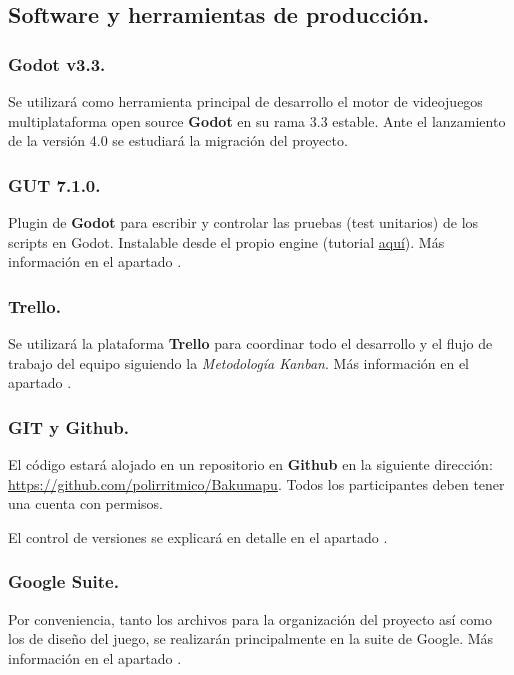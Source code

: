 \subsection{Software y herramientas de producción.}\label{intro:software-y-herramientas}

\subsubsection{Godot v3.3.}
Se utilizará como herramienta principal de desarrollo el motor de videojuegos multiplataforma open source \textbf{Godot} en su rama 3.3 estable. Ante el lanzamiento de la versión 4.0 se estudiará la migración del proyecto.

\subsubsection*{\small GUT 7.1.0.}
Plugin de \textbf{Godot} para escribir y controlar las pruebas (test unitarios) de los scripts en Godot. Instalable desde el propio engine (tutorial \href{https://www.youtube.com/watch?v=5DrhMiuLRl0}{aquí}). Más información en el apartado .

\subsubsection{Trello.}
Se utilizará la plataforma \textbf{Trello} para coordinar todo el desarrollo y el flujo de trabajo del equipo siguiendo la \emph{Metodología Kanban}. Más información en el apartado .

\subsubsection{GIT y Github.}
El código estará alojado en un repositorio  en \textbf{Github} en la siguiente dirección: \url{https://github.com/polirritmico/Bakumapu}. Todos los participantes deben tener una cuenta con permisos.

El control de versiones se explicará en detalle en el apartado .

\subsubsection{Google Suite.}
Por conveniencia, tanto los archivos para la organización del proyecto así como los de diseño del juego, se realizarán principalmente en la suite de Google. Más información en el apartado .

